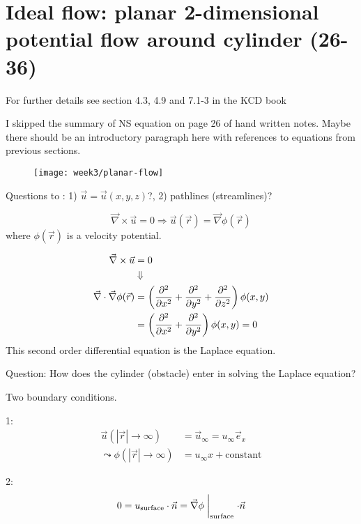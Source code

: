 \section{Ideal flow: planar 2-dimensional potential flow around cylinder (26-36)}

\begin{framed}
For further details see section 4.3, 4.9 and 7.1-3 in the KCD book
\end{framed}

\begin{shaded}
I skipped the summary of NS equation on page 26 of hand written notes. Maybe there should be an introductory paragraph here with references to equations from previous sections.
\end{shaded}

\begin{figure}[!h]
    \centering
    \texttt{[image: week3/planar-flow]}
    \caption{}
    \label{fig:planar-flow}
\end{figure}

Questions to : 1) $\vec{u} = \vec{u}(x,y,z)$?, 2) pathlines (streamlines)?

\begin{equation}
\vec{\nabla}\times\vec{u} = 0 \Rightarrow \vec{u}(\vec{r}) = \vec{\nabla}\phi(\vec{r})
\end{equation}
where $\phi(\vec{r})$ is a velocity potential.

\begin{align}
\vec{\nabla}\times\vec{u} &= 0\\
&\Downarrow\notag\\
\vec{\nabla}\cdot\vec{\nabla}\phi(\vec{r}) &= \left(\frac{\partial^2 }{\partial x^2}+\frac{\partial^2 }{\partial y^2}+\frac{\partial^2 }{\partial z^2}\right)\phi(x,y)\\
&= \left(\frac{\partial^2 }{\partial x^2}+\frac{\partial^2 }{\partial y^2}\right)\phi(x,y) = 0
\end{align}
This second order differential equation is the Laplace equation.

Question: How does the cylinder (obstacle) enter in solving the Laplace equation?

Two boundary conditions.

1:
\begin{align}
\vec{u}(|\vec{r}|\rightarrow\infty) &= \vec{u}_\infty = u_\infty\vec{e}_x \\
\leadsto
\phi(|\vec{r}|\rightarrow\infty) &= u_\infty x + \mathrm{constant}
\end{align}

2:
\begin{equation}
0=u_\mathrm{surface}\cdot \vec{n} = \vec{\nabla}\phi\biggm\vert_\mathrm{surface}\cdot\vec{n}
\end{equation}

